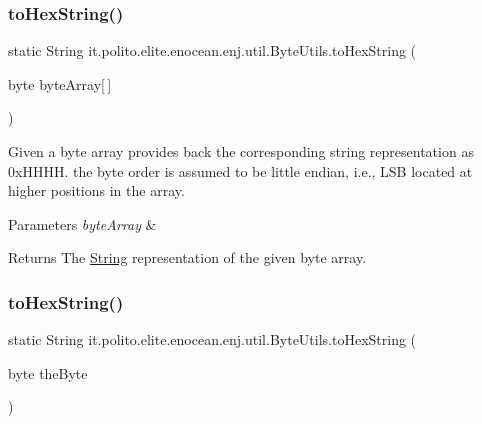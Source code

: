 \subsubsection{\texorpdfstring{to\+Hex\+String()}{toHexString()}\hspace{0.1cm}{\footnotesize\ttfamily [1/2]}}
{\footnotesize\ttfamily static String it.\+polito.\+elite.\+enocean.\+enj.\+util.\+Byte\+Utils.\+to\+Hex\+String (\begin{DoxyParamCaption}\item[{byte}]{byte\+Array\mbox{[}$\,$\mbox{]} }\end{DoxyParamCaption})\hspace{0.3cm}{\ttfamily [static]}}

Given a byte array provides back the corresponding string representation as 0x\+H\+H\+HH. the byte order is assumed to be little endian, i.\+e., L\+SB located at higher positions in the array.


\begin{DoxyParams}{Parameters}
{\em byte\+Array} & \\
\hline
\end{DoxyParams}
\begin{DoxyReturn}{Returns}
The \hyperlink{}{String} representation of the given byte array. 
\end{DoxyReturn}
\hypertarget{classit_1_1polito_1_1elite_1_1enocean_1_1enj_1_1util_1_1_byte_utils_aadd9b46fcbd1b96c67d0724d7aaa614c}{}\label{classit_1_1polito_1_1elite_1_1enocean_1_1enj_1_1util_1_1_byte_utils_aadd9b46fcbd1b96c67d0724d7aaa614c} 
\subsubsection{\texorpdfstring{to\+Hex\+String()}{toHexString()}\hspace{0.1cm}{\footnotesize\ttfamily [2/2]}}
{\footnotesize\ttfamily static String it.\+polito.\+elite.\+enocean.\+enj.\+util.\+Byte\+Utils.\+to\+Hex\+String (\begin{DoxyParamCaption}\item[{byte}]{the\+Byte }\end{DoxyParamCaption})\hspace{0.3cm}{\ttfamily [static]}}

